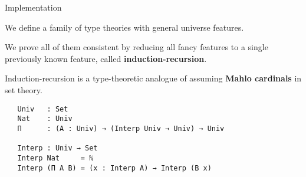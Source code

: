 \documentclass[dvipsnames,10pt,aspectratio=169]{beamer}
\begin{document}
\begin{frame}[fragile]{Implementation}

We define a family of type theories with general universe features.
\vspace{1em}

We prove all of them consistent by reducing all fancy features to
a single previously known feature, called \textbf{induction-recursion}.
\vspace{1em}

Induction-recursion is a type-theoretic analogue of assuming \textbf{Mahlo cardinals} in set theory.

\begin{verbatim}
   Univ   : Set
   Nat    : Univ
   Π      : (A : Univ) → (Interp Univ → Univ) → Univ

   Interp : Univ → Set
   Interp Nat     = ℕ
   Interp (Π A B) = (x : Interp A) → Interp (B x)
\end{verbatim}


\end{frame}







\end{document}
